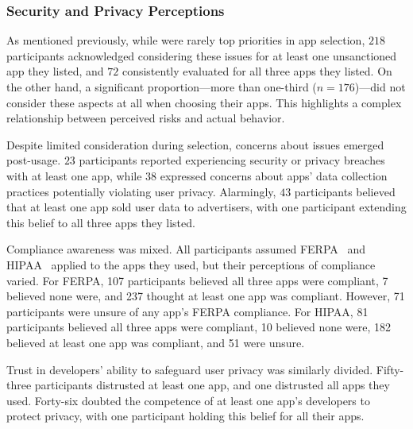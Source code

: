 \subsubsection{Security and Privacy Perceptions}
\label{sp_perceptions}
As mentioned previously, while \sp were rarely top priorities in app selection, $218$ participants acknowledged considering these issues for at least one unsanctioned app they listed, and $72$ consistently evaluated \sp for all three apps they listed. On the other hand, a significant proportion---more than one-third ($n=176$)---did not consider these aspects at all when choosing their apps. 
This highlights a complex relationship between perceived risks and actual behavior.



Despite limited consideration during selection, concerns about \sp issues emerged post-usage. 
$23$ participants reported experiencing security or privacy breaches with at least one app, while $38$ expressed concerns about apps' data collection practices potentially violating user privacy. 
Alarmingly, $43$ participants believed that at least one app sold user data to advertisers, with one participant extending this belief to all three apps they listed.

Compliance awareness was mixed. 
All participants assumed FERPA~\cite{ferpa} and HIPAA~\cite{hipaa} applied to the apps they used, but their perceptions of compliance varied.
For FERPA, 107 participants believed all three apps were compliant, 7 believed none were, and 237 thought at least one app was compliant. However, 71 participants were unsure of any app's FERPA compliance. For HIPAA, 81 participants believed all three apps were compliant, 10 believed none were, 182 believed at least one app was compliant, and 51 were unsure.

Trust in developers’ ability to safeguard user privacy was similarly divided. Fifty-three participants distrusted at least one app, and one distrusted all apps they used. Forty-six doubted the competence of at least one app’s developers to protect privacy, with one participant holding this belief for all their apps.

